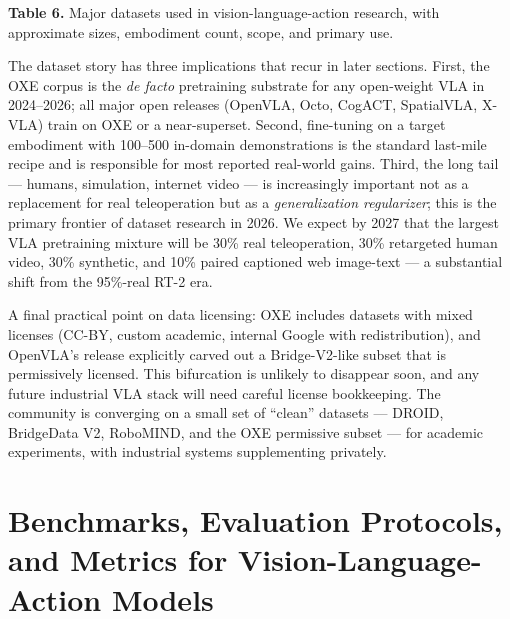 \textbf{Table 6.} Major datasets used in vision-language-action research, with approximate sizes, embodiment count, scope, and primary use.

The dataset story has three implications that recur in later sections. First, the OXE corpus is the \emph{de facto} pretraining substrate for any open-weight VLA in 2024--2026; all major open releases (OpenVLA, Octo, CogACT, SpatialVLA, X-VLA) train on OXE or a near-superset. Second, fine-tuning on a target embodiment with 100--500 in-domain demonstrations is the standard last-mile recipe and is responsible for most reported real-world gains. Third, the long tail --- humans, simulation, internet video --- is increasingly important not as a replacement for real teleoperation but as a \emph{generalization regularizer}; this is the primary frontier of dataset research in 2026. We expect by 2027 that the largest VLA pretraining mixture will be 30\% real teleoperation, 30\% retargeted human video, 30\% synthetic, and 10\% paired captioned web image-text --- a substantial shift from the 95\%-real RT-2 era.

A final practical point on data licensing: OXE includes datasets with mixed licenses (CC-BY, custom academic, internal Google with redistribution), and OpenVLA's release explicitly carved out a Bridge-V2-like subset that is permissively licensed. This bifurcation is unlikely to disappear soon, and any future industrial VLA stack will need careful license bookkeeping. The community is converging on a small set of ``clean'' datasets --- DROID, BridgeData V2, RoboMIND, and the OXE permissive subset --- for academic experiments, with industrial systems supplementing privately.

\section{Benchmarks, Evaluation Protocols, and Metrics for Vision-Language-Action Models}\label{benchmarks-evaluation-protocols-and-metrics-for-vision-language-action-models}

